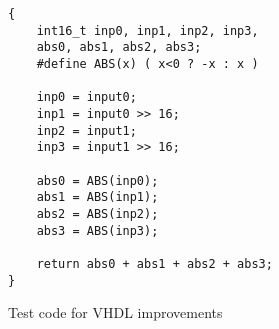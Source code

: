 \begin{figure}
	\centering
	\begin{lstlisting}[frame=single]
{
	int16_t inp0, inp1, inp2, inp3,
	abs0, abs1, abs2, abs3;
	#define ABS(x) ( x<0 ? -x : x )
	
	inp0 = input0;
	inp1 = input0 >> 16;
	inp2 = input1;
	inp3 = input1 >> 16;
	
	abs0 = ABS(inp0);
	abs1 = ABS(inp1);
	abs2 = ABS(inp2);
	abs3 = ABS(inp3);
	
	return abs0 + abs1 + abs2 + abs3;
}

	\end{lstlisting}
	\caption{Test code for VHDL improvements}
\label{code:vhdl-eval}
\end{figure}